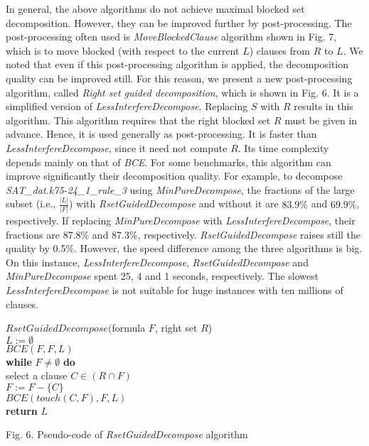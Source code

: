 \documentclass{llncs}
\begin{document}
 In general, the above
algorithms do not achieve maximal blocked set decomposition.
However, they can be improved further by post-processing. The
post-processing often used is \emph{MoveBlockedClause} algorithm
shown in Fig. 7, which is to move blocked (with respect to the
current $L$) clauses from $R$ to $L$. We noted that even if this
post-processing algorithm is applied, the decomposition quality can
be improved still. For this reason, we present a new post-processing
algorithm, called \emph{Right set guided decomposition}, which is
shown in Fig. 6.  It is a simplified version of
\emph{LessInterfereDecompose}. Replacing $S$ with $R$ results in
this algorithm. This algorithm requires that the right blocked  set
$R$ must be given in advance. Hence, it is used generally as
post-processing.  It is faster than \emph{LessInterfereDecompose},
since it need not compute $R$. Its time complexity depends mainly
on that of \emph{BCE}. For some benchmarks, this algorithm can
improve significantly their decomposition quality. For example, to
decompose \emph{SAT\_dat.k75-24\_1\_rule\_3} using
\emph{MinPureDecompose}, the fractions of the large subset (i.e.,
$\frac{|L|}{|F|}$) with \emph{RsetGuidedDecompose} and without it
are $83.9\%$ and $69.9\%$, respectively. If replacing
\emph{MinPureDecompose} with \emph{LessInterfereDecompose}, their
fractions are 87.8\% and 87.3\%, respectively.
\emph{RsetGuidedDecompose} raises still the quality by 0.5\%.
However, the speed difference among the three algorithms is big. On
this instance, \emph{LessInterfereDecompose},
\emph{RsetGuidedDecompose} and \emph{MinPureDecompose} spent 25, 4
and 1 seconds, respectively. The slowest
\emph{LessInterfereDecompose} is not suitable for huge instances
with ten millions of clauses.

\begin{flushleft}
\begin{sf}
\begin{footnotesize}

\hskip 12mm $RsetGuidedDecompose($formula $F$, right set $R$)\\
\hskip 16mm $ L := \emptyset $\\
\hskip 16mm $BCE(F,F,L)$\\
\hskip 16mm {\bf while } $ F \neq \emptyset $ {\bf do}\\
\hskip 20mm    select a clause $C \in (R \cap F) $\\
\hskip 20mm    $F := F - \{C\}$\\
\hskip 20mm    $BCE(touch(C, F),F, L)$\\
\hskip 16mm {\bf return} $L$

\vspace{1em}

\hskip 8mm \textrm{Fig. 6. Pseudo-code of \emph{RsetGuidedDecompose}
algorithm}
\end{footnotesize}
\end{sf}
\end{flushleft}
\end{document}
